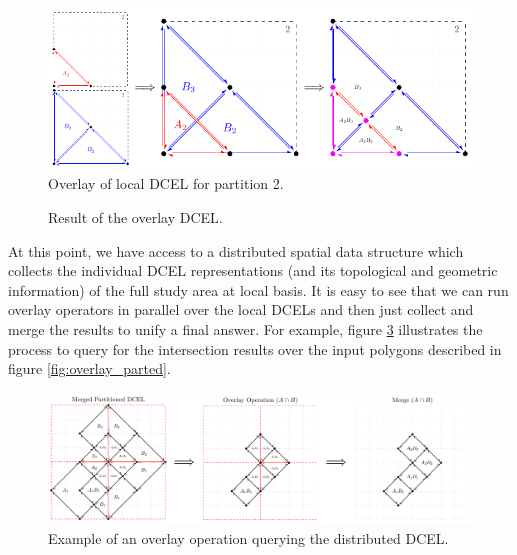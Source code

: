 \begin{figure}
    \centering
    \includegraphics[width=0.9\linewidth]{figures/02-Part2}
    \caption{Overlay of local DCEL for partition 2.}\label{fig:part2}
\end{figure}

\begin{figure}
    \centering
        
    \caption{Result of the overlay DCEL.}\label{fig:merged_dcel}
\end{figure}

At this point, we have access to a distributed spatial data structure which collects the individual DCEL representations (and its topological and geometric information) of the full study area at local basis.  It is easy to see that we can run overlay operators in parallel over the local DCELs and then just collect and merge the results to unify a final answer.  For example, figure \ref{fig:overlay_parted2} illustrates the process to query for the intersection results over the input polygons described in figure \ref{fig:overlay_parted}.  

\begin{figure}[!ht]
    \centering
    \includegraphics[width=\linewidth]{figures/03-OverlayParted2}
    \caption{Example of an overlay operation querying the distributed DCEL.} \label{fig:overlay_parted2}
\end{figure}

